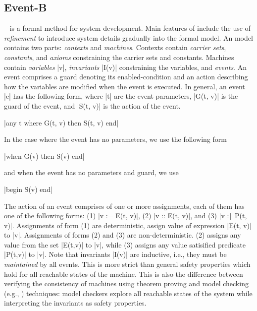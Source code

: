
\subsection{Event-B}
\label{sec:eventb}

\EventB~\cite{abrial10:_model_event_b} is a formal method for system
development.  Main features of \EventB include the use of
\emph{refinement} to introduce system details gradually into the
formal model.  An \EventB model contains two parts: \emph{contexts} and \emph{machines}. Contexts contain \emph{carrier sets}, \emph{constants}, and \emph{axioms} constraining the carrier sets and constants.  Machines contain \emph{variables} |v|, \emph{invariants} |I(v)| constraining the variables, and \emph{events}. An event comprises a guard denoting its enabled-condition and an action describing how the variables are modified when the event is executed.  In general, an event |e| has the following form, where |t| are the event parameters, |G(t, v)| is the guard of the event, and |S(t, v)| is the action of the event.
\begin{center}
  |any t where G(t, v) then S(t, v) end|
\end{center}
In the case where the event has no parameters, we use the following form
\begin{center}
  |when G(v) then S(v) end|
\end{center}
and when the event has no parameters and guard, we use
\begin{center}
  |begin S(v) end|
\end{center}
The action of an event comprises of one or more assignments, each of them has one of the following forms: (1) |v := E(t, v)|, (2) |v :: E(t, v)|, and (3) |v :∣ P(t, v)|.  Assignments of form (1) are deterministic, assign value of expression |E(t, v)| to |v|.  Assignments of forms (2) and (3) are non-deterministic. (2) assigns any value from the set |E(t,v)| to |v|, while (3) assigns any value satisified predicate |P(t,v)| to |v|.
Note that invariants |I(v)| are inductive, i.e., they must be \emph{maintained} by all events. This is more strict than general safety properties which hold for all reachable states of the \EventB machine.  This is also the difference between verifying the consistency of \EventB machines using theorem proving and model checking (e.g., \PROB) techniques: model checkers explore all reachable states of the system while interpreting the invariants as safety properties.

